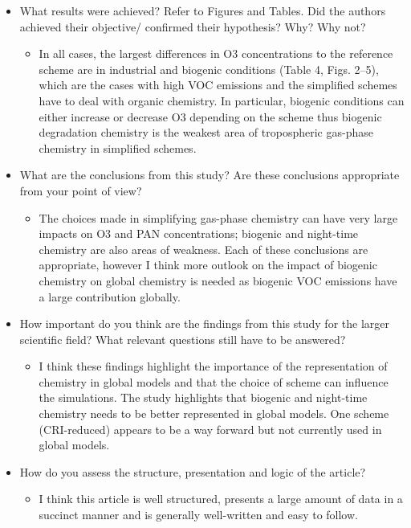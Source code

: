 \documentclass[11pt]{article}
\begin{document}
\begin{itemize}
    \item What results were achieved? Refer to Figures and Tables. Did the authors achieved their objective/ confirmed their hypothesis? Why? Why not?
        \begin{itemize}
          \renewcommand\labelitemii{$\rightarrow$}
         \item In all cases, the largest differences in O3 concentrations to the reference scheme are in industrial and biogenic conditions (Table 4, Figs. 2--5), which are the cases with high VOC emissions and the simplified schemes have to deal with organic chemistry. In particular, biogenic conditions can either increase or decrease O3 depending on the scheme thus biogenic degradation chemistry is the weakest area of tropospheric gas-phase chemistry in simplified schemes.
        \end{itemize}

    \item What are the conclusions from this study? Are these conclusions appropriate from your point of view?
        \begin{itemize}
          \renewcommand\labelitemii{$\rightarrow$}
         \item The choices made in simplifying gas-phase chemistry can have very large impacts on O3 and PAN concentrations; biogenic and night-time chemistry are also areas of weakness. Each of these conclusions are appropriate, however I think more outlook on the impact of biogenic chemistry on global chemistry is needed as biogenic VOC emissions have a large contribution globally.
        \end{itemize}

    \item How important do you think are the findings from this study for the larger scientific field? What relevant questions still have to be answered?
        \begin{itemize}
          \renewcommand\labelitemii{$\rightarrow$}
         \item I think these findings highlight the importance of the representation of chemistry in global models and that the choice of scheme can influence the simulations. The study highlights that biogenic and night-time chemistry needs to be better represented in global models. One scheme (CRI-reduced) appears to be a way forward but not currently used in global models.
        \end{itemize}

    \item How do you assess the structure, presentation and logic of the article?
        \begin{itemize}
          \renewcommand\labelitemii{$\rightarrow$}
         \item I think this article is well structured, presents a large amount of data in a succinct manner and is generally well-written and easy to follow.
        \end{itemize}

\end{itemize}
\end{document}
